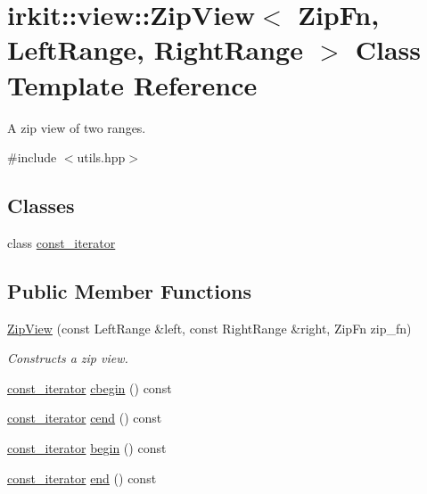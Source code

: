 \hypertarget{classirkit_1_1view_1_1ZipView}{}\section{irkit\+:\+:view\+:\+:Zip\+View$<$ Zip\+Fn, Left\+Range, Right\+Range $>$ Class Template Reference}
\label{classirkit_1_1view_1_1ZipView}


A zip view of two ranges.  




{\ttfamily \#include $<$utils.\+hpp$>$}

\subsection*{Classes}
\begin{DoxyCompactItemize}
\item 
class \mbox{\hyperlink{classirkit_1_1view_1_1ZipView_1_1const__iterator}{const\+\_\+iterator}}
\end{DoxyCompactItemize}
\subsection*{Public Member Functions}
\begin{DoxyCompactItemize}
\item 
\mbox{\hyperlink{classirkit_1_1view_1_1ZipView_a581e90890462717bbdac0f02dc343641}{Zip\+View}} (const Left\+Range \&left, const Right\+Range \&right, Zip\+Fn zip\+\_\+fn)
\begin{DoxyCompactList}\small\item\em Constructs a zip view. \end{DoxyCompactList}\item 
\mbox{\hyperlink{classirkit_1_1view_1_1ZipView_1_1const__iterator}{const\+\_\+iterator}} \mbox{\hyperlink{classirkit_1_1view_1_1ZipView_ab92e5ce12bcf45a9a797294d5b2e97e7}{cbegin}} () const
\item 
\mbox{\hyperlink{classirkit_1_1view_1_1ZipView_1_1const__iterator}{const\+\_\+iterator}} \mbox{\hyperlink{classirkit_1_1view_1_1ZipView_a5ba1f0456da3ffc049e59418b4a01a3f}{cend}} () const
\item 
\mbox{\hyperlink{classirkit_1_1view_1_1ZipView_1_1const__iterator}{const\+\_\+iterator}} \mbox{\hyperlink{classirkit_1_1view_1_1ZipView_af278d23b14dd71c1c5d7e145a5d0771b}{begin}} () const
\item 
\mbox{\hyperlink{classirkit_1_1view_1_1ZipView_1_1const__iterator}{const\+\_\+iterator}} \mbox{\hyperlink{classirkit_1_1view_1_1ZipView_ab8a193bad7c33b93367014f32e9cf360}{end}} () const
\end{DoxyCompactItemize}


